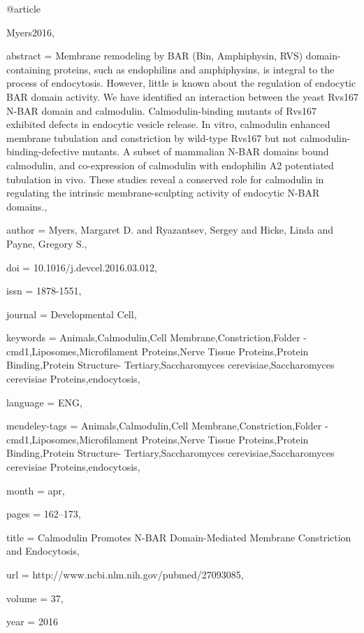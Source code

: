 @article{Myers2016,

abstract = {Membrane remodeling by BAR (Bin, Amphiphysin, RVS) domain-containing proteins, such as endophilins and amphiphysins, is integral to the process of endocytosis. However, little is known about the regulation of endocytic BAR domain activity. We have identified an interaction between the yeast Rvs167 N-BAR domain and calmodulin. Calmodulin-binding mutants of Rvs167 exhibited defects in endocytic vesicle release. In vitro, calmodulin enhanced membrane tubulation and constriction by wild-type Rvs167 but not calmodulin-binding-defective mutants. A subset of mammalian N-BAR domains bound calmodulin, and co-expression of calmodulin with endophilin A2 potentiated tubulation in vivo. These studies reveal a conserved role for calmodulin in regulating the intrinsic membrane-sculpting activity of endocytic N-BAR domains.},

author = {Myers, Margaret D. and Ryazantsev, Sergey and Hicke, Linda and Payne, Gregory S.},

doi = {10.1016/j.devcel.2016.03.012},

issn = {1878-1551},

journal = {Developmental Cell},

keywords = {Animals,Calmodulin,Cell Membrane,Constriction,Folder - cmd1,Liposomes,Microfilament Proteins,Nerve Tissue Proteins,Protein Binding,Protein Structure- Tertiary,Saccharomyces cerevisiae,Saccharomyces cerevisiae Proteins,endocytosis},

language = {ENG},

mendeley-tags = {Animals,Calmodulin,Cell Membrane,Constriction,Folder - cmd1,Liposomes,Microfilament Proteins,Nerve Tissue Proteins,Protein Binding,Protein Structure- Tertiary,Saccharomyces cerevisiae,Saccharomyces cerevisiae Proteins,endocytosis},

month = {apr},

pages = {162--173},

title = {{Calmodulin Promotes N-BAR Domain-Mediated Membrane Constriction and Endocytosis}},

url = {http://www.ncbi.nlm.nih.gov/pubmed/27093085},

volume = {37},

year = {2016}

}

